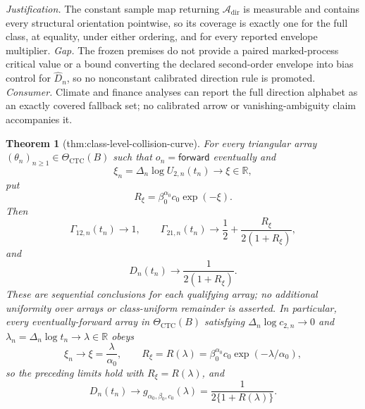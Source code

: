 \documentclass{article}
\newtheorem{theorem}{Theorem}
\begin{document}
\par\smallskip\noindent \textit{Justification.} The constant sample map returning \(\mathcal A_{\mathrm{dir}}\) is measurable and contains every structural orientation pointwise, so its coverage is exactly one for the full class, at equality, under either ordering, and for every reported envelope multiplier. \textit{Gap.} The frozen premises do not provide a paired marked-process critical value or a bound converting the declared second-order envelope into bias control for \(\widehat D_n\), so no nonconstant calibrated direction rule is promoted. \textit{Consumer.} Climate and finance analyses can report the full direction alphabet as an exactly covered fallback set; no calibrated arrow or vanishing-ambiguity claim accompanies it.

\begin{theorem}[thm:class-level-collision-curve]\label{thm:class-level-collision-curve}
For every triangular array \((\theta_n)_{n\geq1}\in\Theta_{\mathrm{CTC}}(B)\) such that \(o_n=\mathsf{forward}\) eventually and
\[
\xi_n=\Delta_n\log U_{2,n}(t_n)\longrightarrow\xi\in\mathbb R,
\]
put
\[
R_\xi=\beta_0^{\alpha_0}c_0\exp(-\xi).
\]
Then
\[
\Gamma_{12,n}(t_n)\longrightarrow1,
\qquad
\Gamma_{21,n}(t_n)\longrightarrow
\frac12+\frac{R_\xi}{2(1+R_\xi)},
\]
and
\[
D_n(t_n)\longrightarrow\frac{1}{2(1+R_\xi)}.
\]
These are sequential conclusions for each qualifying array; no additional uniformity over arrays or class-uniform remainder is asserted. In particular, every eventually-forward array in \(\Theta_{\mathrm{CTC}}(B)\) satisfying \(\Delta_n\log c_{2,n}\to0\) and \(\lambda_n=\Delta_n\log t_n\to\lambda\in\mathbb R\) obeys
\[
\xi_n\longrightarrow\xi=\frac{\lambda}{\alpha_0},
\qquad
R_\xi=R(\lambda)=\beta_0^{\alpha_0}c_0\exp(-\lambda/\alpha_0),
\]
so the preceding limits hold with \(R_\xi=R(\lambda)\), and
\[
D_n(t_n)\longrightarrow g_{\alpha_0,\beta_0,c_0}(\lambda)
=\frac{1}{2\{1+R(\lambda)\}}.
\]
\end{theorem}
\end{document}
